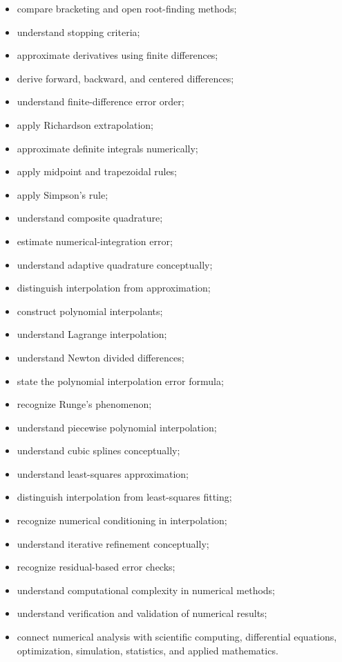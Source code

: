 {\begin{itemize}
    \item compare bracketing and open root-finding methods;
    \item understand stopping criteria;
    \item approximate derivatives using finite differences;
    \item derive forward, backward, and centered differences;
    \item understand finite-difference error order;
    \item apply Richardson extrapolation;
    \item approximate definite integrals numerically;
    \item apply midpoint and trapezoidal rules;
    \item apply Simpson's rule;
    \item understand composite quadrature;
    \item estimate numerical-integration error;
    \item understand adaptive quadrature conceptually;
    \item distinguish interpolation from approximation;
    \item construct polynomial interpolants;
    \item understand Lagrange interpolation;
    \item understand Newton divided differences;
    \item state the polynomial interpolation error formula;
    \item recognize Runge's phenomenon;
    \item understand piecewise polynomial interpolation;
    \item understand cubic splines conceptually;
    \item understand least-squares approximation;
    \item distinguish interpolation from least-squares fitting;
    \item recognize numerical conditioning in interpolation;
    \item understand iterative refinement conceptually;
    \item recognize residual-based error checks;
    \item understand computational complexity in numerical methods;
    \item understand verification and validation of numerical results;
    \item connect numerical analysis with scientific computing,
          differential equations, optimization, simulation, statistics,
          and applied mathematics.
\end{itemize}
}

